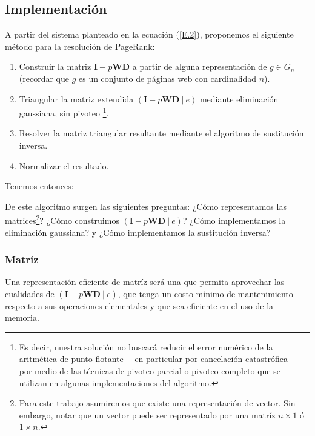 \vspace{1em}

\subsection{Implementación} A partir del sistema planteado en la ecuación (\ref{E.2}), proponemos el siguiente método para la resolución de PageRank:
\vspace{1em}

\begin{enumerate}
    \item Construir la matriz $\textbf{I} - p\textbf{W}\textbf{D}$ a partir de alguna representación de $g \in G_n$ (recordar que $g$ es un conjunto de páginas web con cardinalidad $n$).
    \item Triangular la matriz extendida $(\textbf{I} - p\textbf{W}\textbf{D}\ |\ e)$  mediante eliminación gaussiana, sin pivoteo \footnote{Es decir, nuestra solución no buscará reducir el error numérico de la aritmética de punto flotante ---en particular por cancelación catastrófica--- por medio de las técnicas de pivoteo parcial o pivoteo completo que se utilizan en algunas implementaciones del algoritmo.}.
    \item Resolver la matriz triangular resultante mediante el algoritmo de sustitución inversa. 
    \item Normalizar el resultado.
\end{enumerate}
\vspace{1em} 

\noindent Tenemos entonces:
\vspace{1em}


\vspace{1em}

De este algoritmo surgen las siguientes preguntas: ¿Cómo representamos las matrices\footnote{Para este trabajo asumiremos que existe una representación de vector. Sin embargo, notar que un vector puede ser representado por una matríz $n \times 1$ ó $1 \times n$.}? ¿Cómo construimos $(\mathbf{I} - p\mathbf{W}\mathbf{D}\ |\ e)$? ¿Cómo implementamos la eliminación gaussiana? y ¿Cómo implementamos la sustitución inversa? 





\vspace{2em}
\subsubsection{Matríz} Una representación eficiente de matríz será una que permita aprovechar las cualidades de $(\mathbf{I} - p\mathbf{W}\mathbf{D}\ |\ e)$, que tenga un costo mínimo de mantenimiento respecto a sus operaciones elementales y que sea eficiente en el uso de la memoria. 
\vspace{1em}

